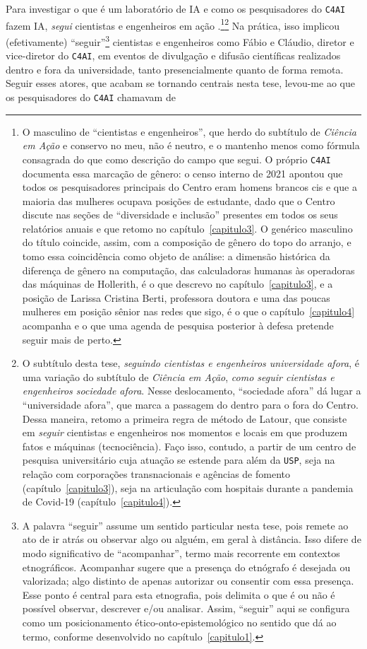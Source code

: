 Para investigar o que é um laboratório de IA e como os pesquisadores do \texttt{C4AI} fazem IA, \textit{segui} cientistas e engenheiros em ação \parencite{Latour1987Science}.\footnote{O masculino de \enquote{cientistas e engenheiros}, que herdo do subtítulo de \textit{Ciência em Ação} e conservo no meu, não é neutro, e o mantenho menos como fórmula consagrada do que como descrição do campo que segui. O próprio \texttt{C4AI} documenta essa marcação de gênero: o censo interno de 2021 apontou que todos os pesquisadores principais do Centro eram homens brancos cis e que a maioria das mulheres ocupava posições de estudante, dado que o Centro discute nas seções de \enquote{diversidade e inclusão} presentes em todos os seus relatórios anuais e que retomo no capítulo~\ref{capitulo3}. O genérico masculino do título coincide, assim, com a composição de gênero do topo do arranjo, e tomo essa coincidência como objeto de análise: a dimensão histórica da diferença de gênero na computação, das calculadoras humanas às operadoras das máquinas de Hollerith, é o que descrevo no capítulo~\ref{capitulo3}, e a posição de Larissa Cristina Berti, professora doutora e uma das poucas mulheres em posição sênior nas redes que sigo, é o que o capítulo~\ref{capitulo4} acompanha e o que uma agenda de pesquisa posterior à defesa pretende seguir mais de perto.}\footnote{O subtítulo desta tese, \textit{seguindo cientistas e engenheiros universidade afora}, é uma variação do subtítulo de \textit{Ciência em Ação}, \textit{como seguir cientistas e engenheiros sociedade afora}. Nesse deslocamento, \enquote{sociedade afora} dá lugar a \enquote{universidade afora}, que marca a passagem do dentro para o fora do Centro. Dessa maneira, retomo a primeira regra de método de Latour, que consiste em \textit{seguir} cientistas e engenheiros nos momentos e locais em que produzem fatos e máquinas (tecnociência). Faço isso, contudo, a partir de um centro de pesquisa universitário cuja atuação se estende para além da \texttt{USP}, seja na relação com corporações transnacionais e agências de fomento (capítulo~\ref{capitulo3}), seja na articulação com hospitais durante a pandemia de Covid-19 (capítulo~\ref{capitulo4}).} Na prática, isso implicou (efetivamente) \enquote{seguir}\footnote{A palavra \enquote{seguir} assume um sentido particular nesta tese, pois remete ao ato de ir atrás ou observar algo ou alguém, em geral à distância. Isso difere de modo significativo de \enquote{acompanhar}, termo mais recorrente em contextos etnográficos. Acompanhar sugere que a presença do etnógrafo é desejada ou valorizada; algo distinto de apenas autorizar ou consentir com essa presença. Esse ponto é central para esta etnografia, pois delimita o que é ou não é possível observar, descrever e/ou analisar. Assim, \enquote{seguir} aqui se configura como um posicionamento ético-onto-epistemológico no sentido que \textcite{Barad2007Meeting} dá ao termo, conforme desenvolvido no capítulo~\ref{capitulo1}.} cientistas e engenheiros como Fábio e Cláudio, diretor e vice-diretor do \texttt{C4AI}, em eventos de divulgação e difusão científicas realizados dentro e fora da universidade, tanto presencialmente quanto de forma remota. Seguir esses atores, que acabam se tornando centrais nesta tese, levou-me ao que os pesquisadores do \texttt{C4AI} chamavam de 